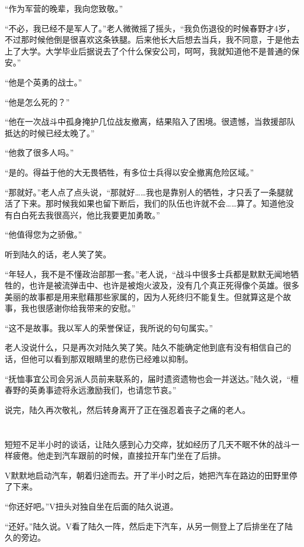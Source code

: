 “作为军营的晚辈，我向您致敬。”

“不必，我已经不是军人了。”老人微微摇了摇头，“我负伤退役的时候春野才4岁，不过那时候他倒是很喜欢这条铁腿。后来他长大后想去当兵，我不同意，于是他去上了大学。大学毕业后据说去了个什么保安公司，呵呵，我就知道他不是普通的保安。”

“他是个英勇的战士。”

“他是怎么死的？”

“他在一次战斗中孤身掩护几位战友撤离，结果陷入了困境。很遗憾，当救援部队抵达的时候已经太晚了。”

“他救了很多人吗。”

“是的。得益于他的大无畏牺牲，有多位士兵得以安全撤离危险区域。”

“那就好。”老人点了点头说，“那就好……我也是靠别人的牺牲，才只丢了一条腿就活了下来。那时候我如果也留下断后，我们的队伍也许就不会……算了。知道他没有白白死去我很高兴，他比我要更加勇敢。”

“他值得您为之骄傲。”

听到陆久的话，老人笑了笑。

“年轻人，我不是不懂政治部那一套。”老人说，“战斗中很多士兵都是默默无闻地牺牲的，也许是被流弹击中、也许是被炮火波及，没有几个真正死得像个英雄。很多美丽的故事都是用来慰藉那些家属的，因为人死终归不能复生。但就算这是个故事，我也很感谢你给我带来的安慰。”

“这不是故事。我以军人的荣誉保证，我所说的句句属实。”

老人没说什么，只是再次对陆久笑了笑。陆久不能确定他到底有没有相信自己的话，但他可以看到那双眼睛里的悲伤已经难以抑制。

“抚恤事宜公司会另派人员前来联系的，届时遗资遗物也会一并送达。”陆久说，“檀春野的英勇事迹将永远激励我们，也请您节哀。”

说完，陆久再次敬礼，然后转身离开了正在强忍着丧子之痛的老人。

\section*{}

短短不足半小时的谈话，让陆久感到心力交瘁，犹如经历了几天不眠不休的战斗一样疲倦。他走到汽车跟前的时候，直接拉开车门坐在了后排。

V默默地启动汽车，朝着归途而去。开了半小时之后，她把汽车在路边的田野里停了下来。

“你还好吧。”V扭头对独自坐在后面的陆久说道。

“还好。”陆久说。V看了陆久一阵，然后走下汽车，从另一侧登上了后排坐在了陆久的旁边。


